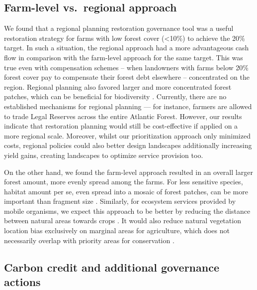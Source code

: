 \documentclass[
	12pt,				%
	oneside,			%
	a4paper,			%
	chapter=TITLE,		%
	section=TITLE,		%
	brazil,			%
	english				%
	]{abntex2}
\begin{document}
\hypertarget{farm-level-vs.-regional-approach}{%
\subsection{Farm-level vs.~regional approach}\label{farm-level-vs.-regional-approach}}

We found that a regional planning restoration governance tool was a useful restoration strategy for farms with low forest cover (\textless10\%) to achieve the 20\% target. In such a situation, the regional approach had a more advantageous cash flow in comparison with the farm-level approach for the same target. This was true even with compensation schemes -- when landowners with farms below 20\% forest cover pay to compensate their forest debt elsewhere -- concentrated on the region. Regional planning also favored larger and more concentrated forest patches, which can be beneficial for biodiversity \autocite{chase_ecosystem_2020}. Currently, there are no established mechanisms for regional planning \autocite{mello_integrating_2021} --- for instance, farmers are allowed to trade Legal Reserves across the entire Atlantic Forest. However, our results indicate that restoration planning would still be cost-effective if applied on a more regional scale. Moreover, whilst our prioritization approach only minimized costs, regional policies could also better design landscapes additionally increasing yield gains, creating landscapes to optimize service provision too.

On the other hand, we found the farm-level approach resulted in an overall larger forest amount, more evenly spread among the farms. For less sensitive species, habitat amount per se, even spread into a mosaic of forest patches, can be more important than fragment size \autocite{arroyorodriguez_designing_2020}. Similarly, for ecosystem services provided by mobile organisms, we expect this approach to be better by reducing the distance between natural areas towards crops \autocite{metzger_considering_2021,mitchell_reframing_2015}. It would also reduce natural vegetation location bias exclusively on marginal areas for agriculture, which does not necessarily overlap with priority areas for conservation \autocite{brancalion_global_2019,d_albertas_private_2021}.

\hypertarget{carbon-credit-and-additional-governance-actions}{%
\subsection{Carbon credit and additional governance actions}\label{carbon-credit-and-additional-governance-actions}}
\end{document}
